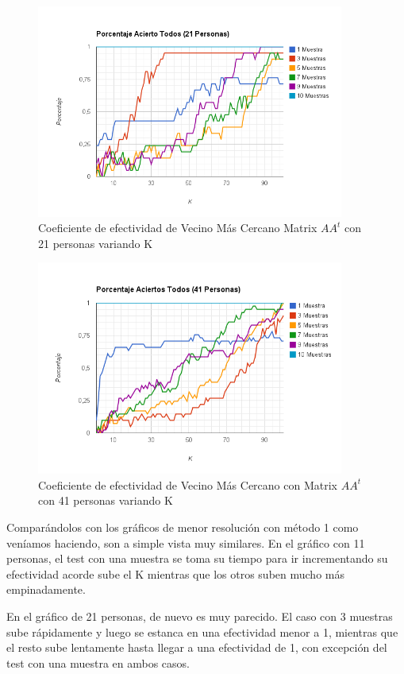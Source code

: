 \begin{figure}[H] \includegraphics[width=0.9\textwidth]{img/imagef11.png} \caption{Coeficiente de
    efectividad de Vecino Más Cercano Matrix $AA^t$ con 21 personas variando K} \end{figure}

\begin{figure}[H] \includegraphics[width=0.9\textwidth]{img/imagef12.png} \caption{Coeficiente de
    efectividad de Vecino Más Cercano con Matrix $AA^t$ con 41 personas variando K} \end{figure}

Comparándolos con los gráficos de menor resolución con método 1 como veníamos haciendo, son a simple vista muy similares. En el gráfico con 11 personas, el test con una muestra se toma su tiempo para ir
incrementando su efectividad acorde sube el K mientras que los otros suben mucho más empinadamente.

En el gráfico de 21 personas, de nuevo es muy parecido. El caso con 3 muestras sube rápidamente y
luego se estanca en una efectividad menor a 1, mientras que el resto sube lentamente hasta llegar a
una efectividad de 1, con excepción del test con una muestra en ambos casos.

